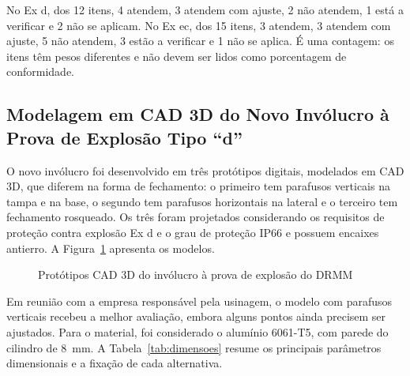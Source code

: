 \documentclass[a4paper, 12pt]{article}
\begin{document}
{\vspace{-0.5\baselineskip}\par}

No Ex d, dos 12 itens, 4 atendem, 3 atendem com ajuste, 2 não atendem, 1 está a verificar e 2 não se aplicam. No Ex ec, dos 15 itens, 3 atendem, 3 atendem com ajuste, 5 não atendem, 3 estão a verificar e 1 não se aplica. É uma contagem: os itens têm pesos diferentes e não devem ser lidos como porcentagem de conformidade.

\subsection{Modelagem em CAD 3D do Novo Invólucro à Prova de Explosão Tipo ``d''}\label{sec:cad}

O novo invólucro foi desenvolvido em três protótipos digitais, modelados em CAD 3D, que diferem na forma de fechamento: o primeiro tem parafusos verticais na tampa e na base, o segundo tem parafusos horizontais na lateral e o terceiro tem fechamento rosqueado. Os três foram projetados considerando os requisitos de proteção contra explosão Ex d e o grau de proteção IP66 e possuem encaixes antierro. A Figura~\ref{fig:cad} apresenta os modelos.

\begin{figure}[H]
    \centering
    \caption{Protótipos CAD 3D do invólucro à prova de explosão do DRMM}
    \label{fig:cad}
\end{figure}

Em reunião com a empresa responsável pela usinagem, o modelo com parafusos verticais recebeu a melhor avaliação, embora alguns pontos ainda precisem ser ajustados. Para o material, foi considerado o alumínio 6061-T5, com parede do cilindro de 8~mm. A Tabela~\ref{tab:dimensoes} resume os principais parâmetros dimensionais e a fixação de cada alternativa.
\end{document}
